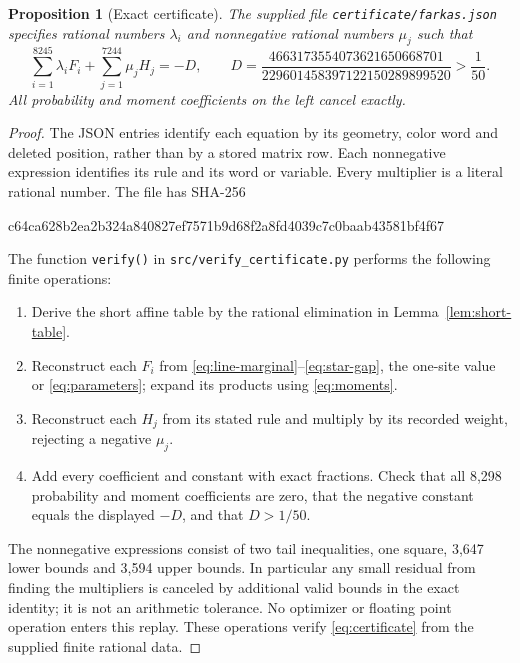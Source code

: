 \documentclass[11pt]{article}
\newtheorem{proposition}[theorem]{Proposition}
\begin{document}
\begin{proposition}[Exact certificate]\label{prop:certificate}
The supplied file \texttt{certificate/farkas.json} specifies rational
numbers $\lambda_i$ and nonnegative rational numbers $\mu_j$ such that
\begin{equation}\label{eq:certificate}
\sum_{i=1}^{8245}\lambda_iF_i+
\sum_{j=1}^{7244}\mu_jH_j=-D,
\qquad
D=\frac{4663173554073621650668701}{229601458397122150289899520}
>\frac1{50}.
\end{equation}
All probability and moment coefficients on the left cancel exactly.
\end{proposition}
\begin{proof}
The JSON entries identify each equation by its geometry, color word and
deleted position, rather than by a stored matrix row. Each nonnegative
expression identifies its rule and its word or variable. Every multiplier
is a literal rational number. The file has SHA-256
\begin{center}\small\ttfamily
c64ca628b2ea2b324a840827ef7571b9d68f2a8fd4039c7c0baab43581bf4f67
\end{center}
The function \texttt{verify()} in \texttt{src/verify\_certificate.py}
performs the following finite operations:
\begin{enumerate}
\item Derive the short affine table by the rational elimination in
Lemma~\ref{lem:short-table}.
\item Reconstruct each $F_i$ from
\eqref{eq:line-marginal}--\eqref{eq:star-gap}, the one-site value or
\eqref{eq:parameters}; expand its products using \eqref{eq:moments}.
\item Reconstruct each $H_j$ from its stated rule and multiply by its
recorded weight, rejecting a negative $\mu_j$.
\item Add every coefficient and constant with exact fractions. Check that
all 8,298 probability and moment coefficients are zero, that the negative
constant equals the displayed $-D$, and that $D>1/50$.
\end{enumerate}
The nonnegative expressions consist of two tail inequalities, one square,
3,647 lower bounds and 3,594 upper bounds. In particular any small residual
from finding the multipliers is canceled by additional valid bounds in the
exact identity; it is not an arithmetic tolerance. No optimizer or floating
point operation enters this replay. These operations verify
\eqref{eq:certificate} from the supplied finite rational data.
\end{proof}
\end{document}
